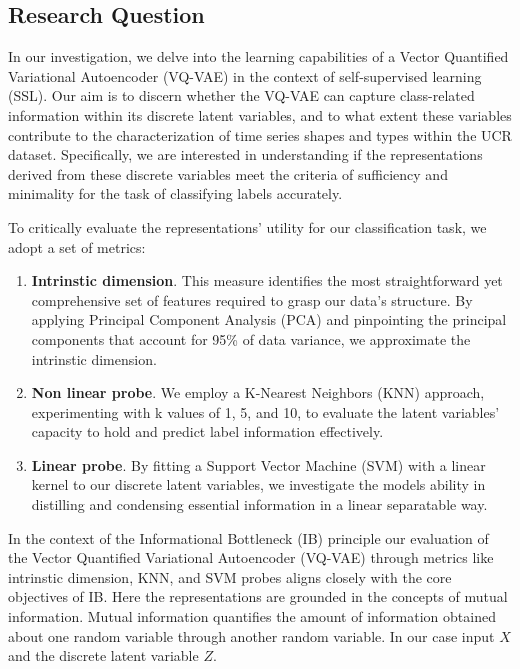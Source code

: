 \subsection*{Research Question}
In our investigation, we delve into the learning capabilities of a Vector Quantified Variational Autoencoder (VQ-VAE) in the context of self-supervised learning (SSL).
Our aim is to discern whether the VQ-VAE can capture class-related information within its discrete latent variables, and to what extent these variables contribute to the characterization of time series shapes and types within the UCR dataset. 
Specifically, we are interested in understanding if the representations derived from these discrete variables meet the criteria of sufficiency and minimality for the task of classifying labels accurately.

To critically evaluate the representations' utility for our classification task, we adopt a set of metrics:
\begin{enumerate}
    \item \textbf{Intrinstic dimension}. This measure identifies the most straightforward yet comprehensive set of features required to grasp our data's structure. By applying Principal Component Analysis (PCA) and pinpointing the principal components that account for 95\%
     of data variance, we approximate the intrinstic dimension.
    \item \textbf{Non linear probe}. We employ a K-Nearest Neighbors (KNN) approach, experimenting with k values of 1, 5, and 10, to evaluate the latent variables' capacity to hold and predict label information effectively. 
    \item \textbf{Linear probe}. By fitting a Support Vector Machine (SVM) with a linear kernel to our discrete latent variables, we investigate the models ability in distilling and condensing essential information in a linear separatable way.
\end{enumerate}

In the context of the Informational Bottleneck (IB) principle \cite{TishbyPereiraBialek2000} our evaluation of the Vector Quantified Variational Autoencoder (VQ-VAE) through metrics like intrinstic dimension, KNN, and SVM probes aligns closely with
the core objectives of IB. Here the representations are grounded in the concepts of mutual information. Mutual information quantifies the amount of information obtained about one random variable through another random variable. In our case input $X$ and the discrete latent variable $Z$.

